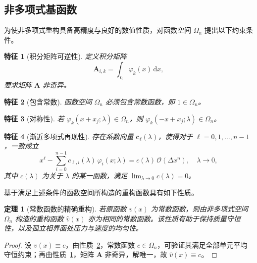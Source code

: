 \documentclass[12pt,a4paper]{article}
\newtheorem{theorem}{定理}[section]
\newtheorem{property}{特征}
\numberwithin{equation}{section}    %
\begin{document}
\subsection{非多项式基函数}

为使非多项式重构具备高精度与良好的数值性质，对函数空间 $\Omega_n$ 提出以下约束条件。

\begin{property}[积分矩阵可逆性]
    \label{prop:nonpol_integral_matrix}
    定义积分矩阵
    \begin{equation}
        \bm{A}_{i,k} = \int_{I_i} \varphi_k(x)\,\mathrm{d}x,
    \end{equation}
    要求矩阵 $\bm{A}$ 非奇异。
\end{property}

\begin{property}[包含常数]
    \label{prop:nonpol_const}
    函数空间 $\Omega_n$ 必须包含常数函数，即 $1 \in \Omega_n$。
\end{property}

\begin{property}[对称性]
    \label{prop:nonpol_symmetry}
    若 $\varphi_k(x+x_j;\lambda) \in \Omega_n$，则 $\varphi_k(-x+x_j;\lambda) \in \Omega_n$。
\end{property}

\begin{property}[渐近多项式再现性]
    \label{prop:nonpol_asymp_poly}
    存在系数向量 $\bm{c}_\ell(\lambda)$，使得对于 $\ell = 0, 1, \ldots, n-1$，一致成立
    \begin{equation}
        x^\ell - \sum_{i=0}^{n-1} c_{\ell,i}(\lambda)\,\varphi_i(x;\lambda)
        = c(\lambda)\,\mathcal{O}(\Delta x^n), \quad \lambda \to 0,
    \end{equation}
    其中 $c(\lambda)$ 为关于 $\lambda$ 的某一函数，满足 $\lim_{\lambda \to 0} c(\lambda) = 0$。
\end{property}

基于满足上述条件的函数空间所构造的重构函数具有如下性质。

\begin{theorem}[常数函数的精确重构]
    \label{thm:nonpol_const}
    若原函数 $v(x)$ 为常数函数，则由非多项式空间 $\Omega_n$ 构造的重构函数 $\hat{v}(x)$
    亦为相同的常数函数。该性质有助于保持质量守恒性，以及孤立相界面处压力与速度的均匀性。
\end{theorem}

\begin{proof}
    设 $v(x) \equiv c$，由性质~\ref{prop:nonpol_const}，常数函数 $c \in \Omega_n$，可验证其满足全部单元平均守恒约束；再由性质~\ref{prop:nonpol_integral_matrix}，矩阵 $\bm{A}$ 非奇异，解唯一，故 $\hat{v}(x) \equiv c$。
\end{proof}
\end{document}
